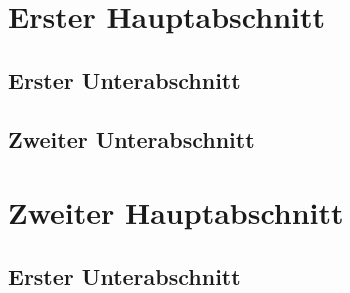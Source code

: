 \begin{refsection}

\section*{Erster Hauptabschnitt}		%
\subsection*{Erster Unterabschnitt}		%
\subsubsection{}	 \blindtext				%
\subsubsection{}	 \blindtext	
\subsection*{Zweiter Unterabschnitt}
\subsubsection{}	 \blindtext				%
\subsubsection{}	 \blindtext[2]				%
\section*{Zweiter Hauptabschnitt}		%
\subsection*{Erster Unterabschnitt}		%
\subsubsection{}	 \blindtext				%
\subsubsection{}	 \blindtext	

\printbibliography
\end{refsection}


